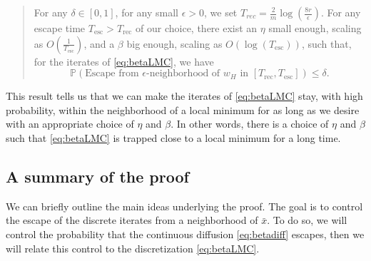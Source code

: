 \documentclass[10pt,journal,a4paper]{IEEEtran}
\theoremstyle{definition}
\newcommand{\Prb}{\mathbb{P}}
\begin{document}
\begin{quote}
\begin{emph}
For any $\delta \in [0, 1]$, for any small $\epsilon >0$, we set $T_{rec} = \frac{2}{m} \log(\frac{8r}{\epsilon})$. For any escape time $T_{\text{esc}} > T_{\text{rec}}$ of our choice, there exist an $\eta$ small enough, scaling as $O(\frac{1}{T_{\text{esc}}})$, and a $\beta$ big enough, scaling as $O(\log(T_{\text{esc}}))$, such that, for the iterates of \eqref{eq:betaLMC}, we have
\[
\Prb(\text{Escape from $\epsilon$-neighborhood of $w_H$ in } [T_{\text{rec}}, T_{\text{esc}}]) \leq \delta.
\]
\end{emph}
\end{quote}

This result tells us that we can make the iterates of \eqref{eq:betaLMC} stay, with high probability, within the neighborhood of a local minimum for as long as we desire with an appropriate choice of $\eta$ and $\beta$. In other words, there is a choice of $\eta$ and $\beta$ such that \eqref{eq:betaLMC} is trapped close to a local minimum for a long time.

\subsection{A summary of the proof}

We can briefly outline the main ideas underlying the proof. The goal is to control the escape of the discrete iterates from a neighborhood of $\bar{x}$. To do so, we will control the probability that the continuous diffusion \eqref{eq:betadiff} escapes, then we will relate this control to the discretization \eqref{eq:betaLMC}.
\end{document}
